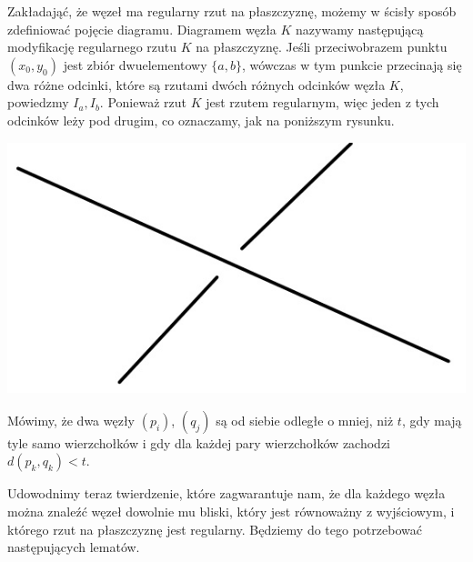 Zakładająć, że węzeł ma regularny rzut na płaszczyznę, możemy w ścisły sposób zdefiniować pojęcie diagramu.
Diagramem węzła $K$ nazywamy następującą modyfikację regularnego rzutu $K$ na płaszczyznę. Jeśli przeciwobrazem punktu $(x_0, y_0)$ jest zbiór dwuelementowy 
$\lbrace a,b\rbrace$, wówczas w tym punkcie przecinają się dwa różne odcinki, które są rzutami dwóch różnych odcinków węzła $K$, powiedzmy $I_a, I_b$. 
Ponieważ rzut $K$ jest rzutem regularnym, więc jeden z tych odcinków leży pod drugim, co oznaczamy, jak na poniższym rysunku. \\

\begin{minipage}{0.3\textwidth}
	\begin{center}

	\includegraphics[scale=0.4]{1/pictures/skrz.jpg}
	\end{center}
	\end{minipage}

\begin{definicja}
 Mówimy, że dwa węzły $(p_i)$, $(q_j)$ są od siebie odległe o mniej, niż $t$, gdy mają tyle samo wierzchołków i gdy dla każdej pary wierzchołków zachodzi $d(p_k,q_k) < t$.
\end{definicja}

Udowodnimy teraz twierdzenie, które zagwarantuje nam, że dla każdego węzła można znaleźć węzeł dowolnie mu bliski, który jest równoważny z wyjściowym, i którego rzut na płaszczyznę jest regularny. 
Będziemy do tego potrzebować następujących lematów.

